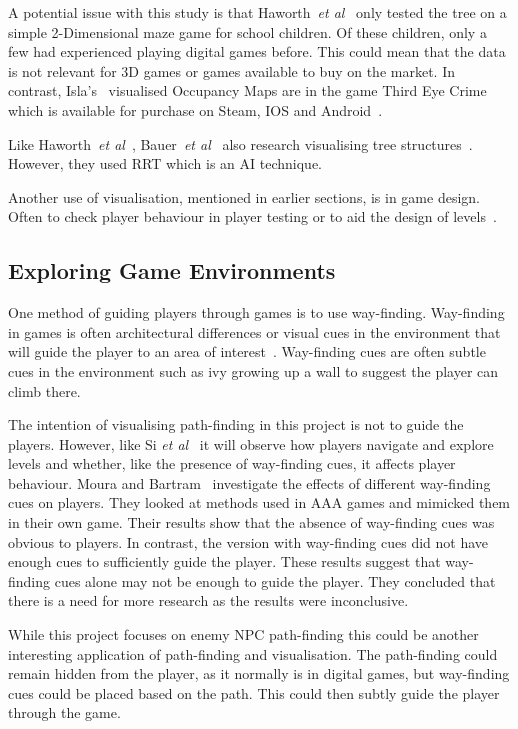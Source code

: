 \documentclass[journal]{IEEEtran}
\begin{document}
A potential issue with this study is that Haworth~\textit{et al}~\cite{Haworth2010} only tested the tree on a simple 2-Dimensional maze game for school children. Of these children, only a few had experienced playing digital games before.  This could mean that the data is not relevant for 3D games or games available to buy on the market.  In contrast, Isla's~\cite{Isla2014} visualised Occupancy Maps are in the game Third Eye Crime which is available for purchase on Steam, IOS and Android~\cite{Isla2014, game:ThirdEyeCrime}.

Like Haworth~\textit{et al}~\cite{Haworth2010}, Bauer~\textit{et al}~\cite{bauer2012} also research visualising tree structures~\cite{bauer2012}. However, they used RRT which is an AI technique.

Another use of visualisation, mentioned in earlier sections, is in game design. Often to check player behaviour in player testing or to aid the design of levels~\cite{Nelson2011,bauer2012, Tremblay2013, Tremblay2014}. 

\subsection{Exploring Game Environments} \label{Exploring}
One method of guiding players through games is to use way-finding. Way-finding in games is often architectural differences or visual cues in the environment that will guide the player to an area of interest~\cite{si2017, Bacim2008}. Way-finding cues are often subtle cues in the environment such as ivy growing up a wall to suggest the player can climb there.

The intention of visualising path-finding in this project is not to guide the players. However, like Si \textit{et al}~\cite{si2017} it will observe how players navigate and explore levels and whether, like the presence of way-finding cues, it affects player behaviour. 
Moura and Bartram~\cite{moura2014} investigate the effects of different way-finding cues on players. They looked at methods used in AAA games and mimicked them in their own game. Their results show that the absence of way-finding cues was obvious to players. In contrast, the version with way-finding cues did not have enough cues to sufficiently guide the player. These results suggest that way-finding cues alone may not be enough to guide the player. They concluded that there is a need for more research as the results were inconclusive. 

While this project focuses on enemy NPC path-finding this could be another interesting application of path-finding and visualisation. The path-finding could remain hidden from the player, as it normally is in digital games, but way-finding cues could be placed based on the path. This could then subtly guide the player through the game.
\end{document}
